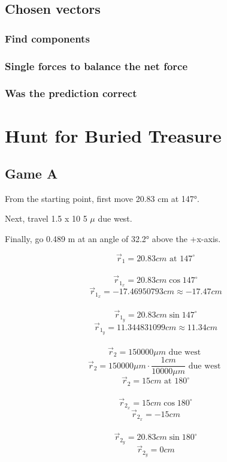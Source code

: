 \documentclass[11pt, letterpaper, includehead]{article}
\begin{document}
\subsection{Chosen vectors} %

\subsubsection{Find components} %

\subsubsection{Single forces to balance the net force} %

\subsubsection{Was the prediction correct} %

\section{Hunt for Buried Treasure} %
\subsection{Game A} %
From the starting point, first move 20.83 cm at 147°.

Next, travel 1.5 x 10 5 $\mu$ due west.

Finally, go 0.489 m at an angle of 32.2° above the +x-axis.

$$\vec{r}_1 = 20.83cm\text{ at }147^{\circ}$$\\
$$\vec{r}_{1_x} = 20.83cm\cos147^{\circ}$$
$$\vec{r}_{1_x} = -17.46950793cm \approx -17.47cm$$\\
$$\vec{r}_{1_y} = 20.83cm\sin147^{\circ}$$
$$\vec{r}_{1_y} = 11.344831099cm \approx 11.34cm$$\\

$$\vec{r}_2 = 150000\mu m\text{ due west }$$
$$\vec{r}_2 = 150000\mu m\cdot\frac{1cm}{10000\mu m}\text{ due west }$$
$$\vec{r}_2 = 15cm\text{ at }180^{\circ}$$\\
$$\vec{r}_{2_x} = 15cm\cos180^{\circ}$$
$$\vec{r}_{2_x} = -15cm$$\\
$$\vec{r}_{2_y} = 20.83cm\sin180^{\circ}$$
$$\vec{r}_{2_y} = 0cm$$\\
\end{document}
